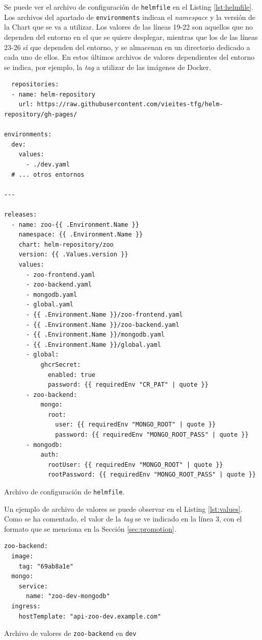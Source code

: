 Se puede ver el archivo de configuración de \texttt{helmfile} en el Listing \ref{lst:helmfile}. Los archivos del apartado de \texttt{environments} indican el \textit{namespace} y la versión de la Chart que se va a utilizar. Los valores de las líneas 19-22 son aquellos que no dependen del entorno en el que se quiere desplegar, mientras que los de las líneas 23-26 sí que dependen del entorno, y se almacenan en un directorio dedicado a cada uno de ellos. En estos últimos archivos de valores dependientes del entorno se indica, por ejemplo, la \textit{tag} a utilizar de las imágenes de Docker.

\begin{longlisting}
  \begin{verbatim}
  repositories:
  - name: helm-repository
    url: https://raw.githubusercontent.com/vieites-tfg/helm-repository/gh-pages/

environments:
  dev:
    values:
      - ./dev.yaml
  # ... otros entornos

---

releases:
  - name: zoo-{{ .Environment.Name }}
    namespace: {{ .Environment.Name }}
    chart: helm-repository/zoo
    version: {{ .Values.version }}
    values:
      - zoo-frontend.yaml
      - zoo-backend.yaml
      - mongodb.yaml
      - global.yaml
      - {{ .Environment.Name }}/zoo-frontend.yaml
      - {{ .Environment.Name }}/zoo-backend.yaml
      - {{ .Environment.Name }}/mongodb.yaml
      - {{ .Environment.Name }}/global.yaml
      - global:
          ghcrSecret:
            enabled: true
            password: {{ requiredEnv "CR_PAT" | quote }}
      - zoo-backend:
          mongo:
            root:
              user: {{ requiredEnv "MONGO_ROOT" | quote }}
              password: {{ requiredEnv "MONGO_ROOT_PASS" | quote }}
      - mongodb:
          auth:
            rootUser: {{ requiredEnv "MONGO_ROOT" | quote }}
            rootPassword: {{ requiredEnv "MONGO_ROOT_PASS" | quote }}
  \end{verbatim}
  \caption{Archivo de configuración de \texttt{helmfile}.}
  \label{lst:helmfile}
\end{longlisting}

Un ejemplo de archivo de valores se puede observar en el Listing \ref{lst:values}. Como se ha comentado, el valor de la \textit{tag} se ve indicado en la línea 3, con el formato que se menciona en la Sección \ref{sec:promotion}.

\begin{listing}[!ht]
  \begin{verbatim}
zoo-backend:
  image:
    tag: "69ab8a1e"
  mongo:
    service:
      name: "zoo-dev-mongodb"
  ingress:
    hostTemplate: "api-zoo-dev.example.com"
  \end{verbatim}
  \caption{Archivo de valores de \texttt{zoo-backend} en \texttt{dev}}
  \label{lst:values}
\end{listing}

